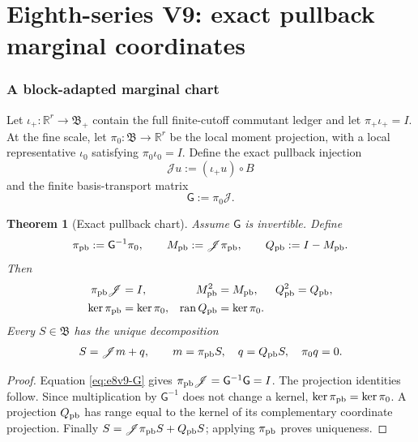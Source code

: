 \documentclass[11pt,oneside]{book}
\newtheorem{theorem}{Theorem}[chapter]
\theoremstyle{definition}
\theoremstyle{remark}
\begin{document}

\part{Eighth-series V9: exact pullback marginal coordinates}
\label{part:e8v9}

\section{A block-adapted marginal chart}
\label{sec:e8v9-chart}

Let \(\iota_+:\mathbb R^r\to{\mathfrak B}_+\) contain the full
finite-cutoff commutant ledger and let
\(\pi_+\iota_+=I\).  At the fine scale, let
\(\pi_0:{\mathfrak B}\to\mathbb R^r\) be the local moment projection,
with a local representative
\(\iota_0\) satisfying \(\pi_0\iota_0=I\).  Define the exact pullback
injection
\[
 {\mathscr J}u:=(\iota_+u)\circ B                   \label{eq:e8v9-J}
\]
and the finite basis-transport matrix
\[
 {\mathsf G}:=\pi_0{\mathscr J}.                    \label{eq:e8v9-G}
\]

\begin{theorem}[Exact pullback chart]
\label{thm:e8v9-chart}
Assume \({\mathsf G}\) is invertible.  Define
\[
 \pi_{\rm pb}:={\mathsf G}^{-1}\pi_0,\qquad
 M_{\rm pb}:={\mathscr J}\pi_{\rm pb},\qquad
 Q_{\rm pb}:=I-M_{\rm pb}.                          \label{eq:e8v9-pb-projections}
\]
Then
\begin{align}
 \pi_{\rm pb}{\mathscr J}&=I,&
 M_{\rm pb}^2&=M_{\rm pb},&
 Q_{\rm pb}^2&=Q_{\rm pb},                          \label{eq:e8v9-projection-identities}\\
 \ker\pi_{\rm pb}&=\ker\pi_0,&
 \operatorname{ran}Q_{\rm pb}&=\ker\pi_0.           \label{eq:e8v9-same-stable}
\end{align}
Every \(S\in{\mathfrak B}\) has the unique decomposition
\[
 S={\mathscr J}m+q,\qquad
 m=\pi_{\rm pb}S,\quad q=Q_{\rm pb}S,\quad
 \pi_0q=0.                                          \label{eq:e8v9-decomposition}
\]
\end{theorem}

\begin{proof}
Equation \eqref{eq:e8v9-G} gives
\(\pi_{\rm pb}{\mathscr J}={\mathsf G}^{-1}{\mathsf G}=I\).
The projection identities follow.  Since multiplication by
\({\mathsf G}^{-1}\) does not change a kernel,
\(\ker\pi_{\rm pb}=\ker\pi_0\).  A projection \(Q_{\rm pb}\) has
range equal to the kernel of its complementary coordinate projection.
Finally \(S={\mathscr J}\pi_{\rm pb}S+Q_{\rm pb}S\);
applying \(\pi_{\rm pb}\) proves uniqueness.
\end{proof}
\end{document}
